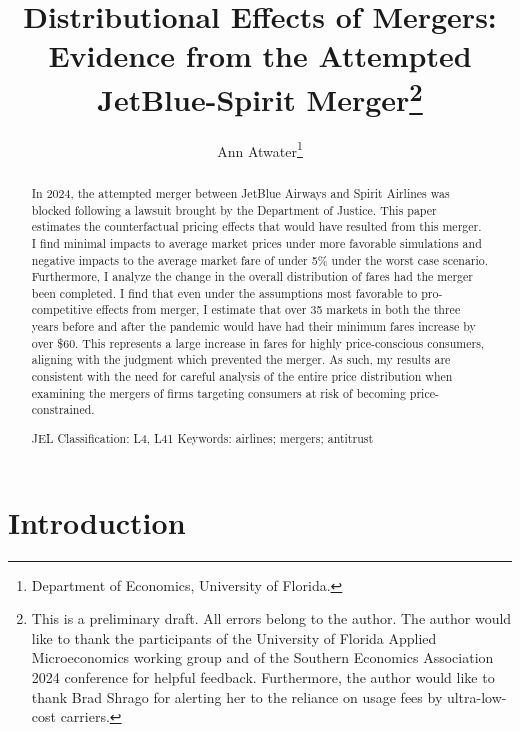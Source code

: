 \documentclass{article}
\author{Ann Atwater\footnote{Department of Economics, University of Florida.}}
\title{Distributional Effects of Mergers: Evidence from the Attempted JetBlue-Spirit Merger\footnote{This is a preliminary draft. All errors belong to the author. The author would like to thank the participants of the University of Florida Applied Microeconomics working group and of the Southern Economics Association 2024 conference for helpful feedback. Furthermore, the author would like to thank Brad Shrago for alerting her to the reliance on usage fees by ultra-low-cost carriers. }}
\begin{document}
	\maketitle
	
	\begin{abstract}
In 2024, the attempted merger between JetBlue Airways and Spirit Airlines was blocked following a lawsuit brought by the Department of Justice. This paper estimates the counterfactual pricing effects that would have resulted from this merger. I find minimal impacts to average market prices under more favorable simulations and negative impacts to the average market fare of under 5\% under the worst case scenario. Furthermore, I analyze the change in the overall distribution of fares had the merger been completed. I find that even under the assumptions most favorable to pro-competitive effects from merger, I estimate that over 35 markets in both the three years before and after the pandemic would have had their minimum fares increase by over \$60. This represents a large increase in fares for highly price-conscious consumers, aligning with the judgment which prevented the merger. As such, my results are consistent with the need for careful analysis of the entire price distribution when examining the mergers of firms targeting  consumers at risk of becoming price-constrained.  \bigskip

    \noindent JEL Classification: L4, L41 \newline
	\noindent Keywords: airlines; mergers; antitrust
		
	\end{abstract}
	
	\pagebreak
	
	\doublespacing
	
	\section{Introduction}
	\label{sec:Introduction} 
\end{document}
